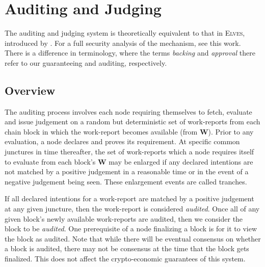 \section{Auditing and Judging}\label{sec:auditing}

The auditing and judging system is theoretically equivalent to that in \textsc{Elves}, introduced by \cite{cryptoeprint:2024/961}. For a full security analysis of the mechanism, see this work. There is a difference in terminology, where the terms \emph{backing} and \emph{approval} there refer to our guaranteeing and auditing, respectively.


\subsection{Overview}

The auditing process involves each node requiring themselves to fetch, evaluate and issue judgement on a random but deterministic set of work-reports from each \Jam chain block in which the work-report becomes available (\ie from $\mathbf{W}$). Prior to any evaluation, a node declares and proves its requirement. At specific common junctures in time thereafter, the set of work-reports which a node requires itself to evaluate from each block's $\mathbf{W}$ may be enlarged if any declared intentions are not matched by a positive judgement in a reasonable time or in the event of a negative judgement being seen. These enlargement events are called tranches.

If all declared intentions for a work-report are matched by a positive judgement at any given juncture, then the work-report is considered \emph{audited}. Once all of any given block's newly available work-reports are audited, then we consider the block to be \emph{audited}. One prerequisite of a node finalizing a block is for it to view the block as audited. Note that while there will be eventual consensus on whether a block is audited, there may not be consensus at the time that the block gets finalized. This does not affect the crypto-economic guarantees of this system.


